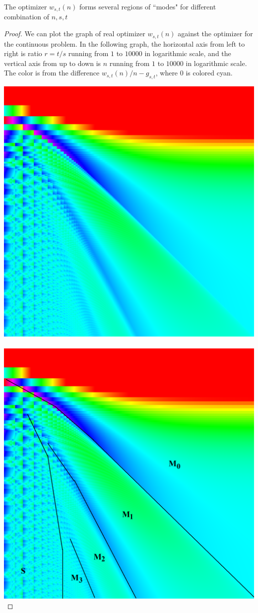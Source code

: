 \documentclass[]{article}
\begin{document}
\begin{lemma} 
	The optimizer $w_{s,t}(n)$ forms several regions of ``modes" for different combination of ${n,s,t}$
\end{lemma}
\begin{proof}
	We can plot the graph of real optimizer $w_{s,t}(n)$ against the optimizer for the continuous problem. In the following graph, the horizontal axis from left to right is ratio $r= t/s$ running from $1$ to $10000$ in logarithmic scale, and the vertical axis from up to down is $n$ running from $1$ to $10000$ in logarithmic scale. The color is from the difference $w_{s,t}(n)/n - g_{s,t}$, where $0$ is colored cyan.
	
	\includegraphics[scale=0.18]{w-map.png}\,\includegraphics[scale=0.18]{w-map-marked.png}
	

\end{proof}
\end{document}

